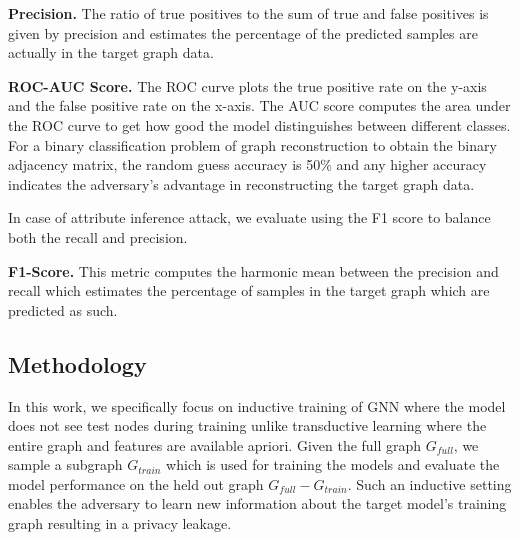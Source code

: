 \noindent\textbf{Precision.} The ratio of true positives to the sum of true and false positives is given by precision and estimates the percentage of the predicted samples are actually in the target graph data.

\noindent\textbf{ROC-AUC Score.} The ROC curve plots the true positive rate on the y-axis and the false positive rate on the x-axis. The AUC score computes the area under the ROC curve to get how good the model distinguishes between different classes.
For a binary classification problem of graph reconstruction to obtain the binary adjacency matrix, the random guess accuracy is 50\% and any higher accuracy indicates the adversary's advantage in reconstructing the target graph data.


\noindent In case of attribute inference attack, we evaluate using the F1 score to balance both the recall and precision.

\noindent\textbf{F1-Score.} This metric computes the harmonic mean between the precision and recall which estimates the percentage of samples in the target graph which are predicted as such.

\subsection{Methodology}

In this work, we specifically focus on inductive training of GNN where the model does not see test nodes during training unlike transductive learning where the entire graph and features are available apriori.
Given the full graph $G_{full}$, we sample a subgraph $G_{train}$ which is used for training the models and evaluate the model performance on the held out graph $G_{full}-G_{train}$.
Such an inductive setting enables the adversary to learn new information about the target model's training graph resulting in a privacy leakage.

